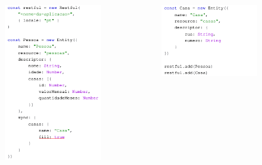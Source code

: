 \documentclass{beamer} %
\begin{document}
\begin{frame}
\vspace*{-0.3cm}
\begin{columns}

    \begin{figure}
        \centering
        \includegraphics[height=\textheight]{imagens/schema-alpha-restful_part1.png}
        \label{fig:schema-alpha-restful-part1}
    \end{figure}
    
    \vspace*{-1.92cm}
    
    \begin{figure}
        \centering
        \includegraphics[height=0.5\textheight]{imagens/schema-alpha-restful_part2.png}
        \label{fig:schema-alpha-restful-part2}
    \end{figure}
    
    \vspace*{-0.4cm}
    

\end{columns}
\end{frame}
\end{document}
